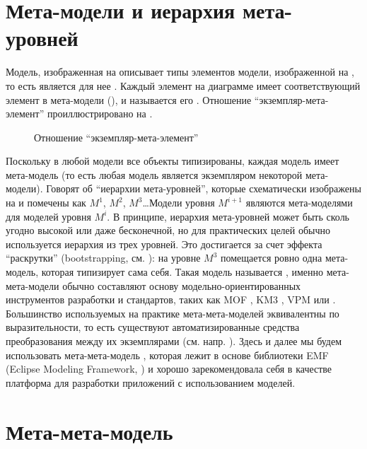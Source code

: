 \section{Мета-модели и иерархия мета-уровней}

Модель, изображенная на  описывает типы элементов модели, изображенной на , то есть является для нее . Каждый элемент на диаграмме  имеет соответствующий элемент в мета-модели (), и называется его . Отношение ``экземпляр-мета-элемент'' проиллюстрировано на .

\begin{figure}[htbp]
\caption{Отношение ``экземпляр-мета-элемент''}\label{ConformsToRelation}
\end{figure}

Поскольку в любой модели все объекты типизированы, каждая модель имеет мета-модель  (то есть любая модель является экземпляром некоторой мета-модели). Говорят об ``иерархии мета-уровней'', которые схематически изображены на   и помечены как $M^1$, $M^2$, $M^3$\ldots Модели уровня $M^{i+1}$ являются мета-моделями для моделей уровня $M^i$. В принципе, иерархия мета-уровней может быть сколь угодно высокой или даже бесконечной, но для практических целей обычно используется иерархия из трех уровней. Это достигается за счет эффекта ``раскрутки'' (bootstrapping, см. \cite{Wirth}): на уровне $M^3$ помещается ровно одна мета-модель, которая типизирует сама себя. Такая модель называется , именно мета-мета-модели обычно составляют основу модельно-ориентированных инструментов разработки и стандартов, таких как MOF \cite{MOF}, KM3 \cite{KM3}, VPM \cite{VPM} или  \cite{EMF}. Большинство используемых на практике мета-мета-моделей эквивалентны по выразительности, то есть существуют автоматизированные средства преобразования между их экземплярами (см. напр. \cite{KM3}). Здесь и далее мы будем использовать мета-мета-модель , которая лежит в основе библиотеки EMF (Eclipse Modeling Framework, \cite{EMF}) и хорошо зарекомендовала себя в качестве платформа для разработки приложений с использованием моделей.

\section{Мета-мета-модель }

